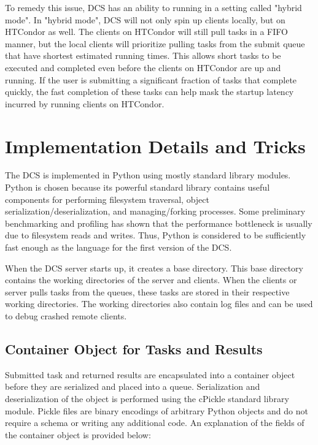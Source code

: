 \documentclass{article}
\begin{document}
To remedy this issue, DCS has an ability to running in a setting called "hybrid mode". In "hybrid mode", DCS will not only spin up clients locally, but on HTCondor as well. The clients on HTCondor will still pull tasks in a FIFO manner, but the local clients will prioritize pulling tasks from the submit queue that have shortest estimated running times. This allows short tasks to be executed and completed even before the clients on HTCondor are up and running. If the user is submitting a significant fraction of tasks that complete quickly, the fast completion of these tasks can help mask the startup latency incurred by running clients on HTCondor.

\section{Implementation Details and Tricks}

The DCS is implemented in Python \cite{van2007python} using mostly standard library modules. Python is chosen because its powerful standard library contains useful components for performing filesystem traversal, object serialization/deserialization, and managing/forking processes. Some preliminary benchmarking and profiling has shown that the performance bottleneck is usually due to filesystem reads and writes. Thus, Python is considered to be sufficiently fast enough as the language for the first version of the DCS.

When the DCS server starts up, it creates a base directory. This base directory contains the working directories of the server and clients. When the clients or server pulls tasks from the queues, these tasks are stored in their respective working directories. The working directories also contain log files and can be used to debug crashed remote clients.

\subsection{Container Object for Tasks and Results}

Submitted task and returned results are encapsulated into a container object before they are serialized and placed into a queue. Serialization and deserialization of the object is performed using the cPickle standard library module. Pickle files are binary encodings of arbitrary Python objects and do not require a schema or writing any additional code. An explanation of the fields of the container object is provided below:
\end{document}
